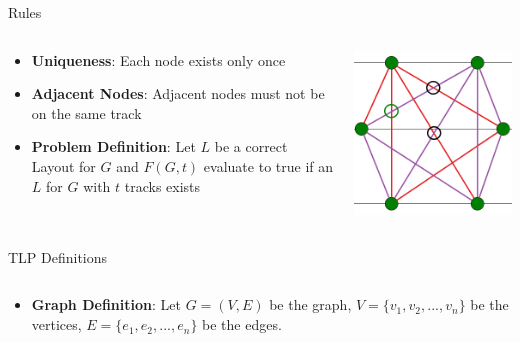 \documentclass[hyperref={pdfpagelabels=false},aspectratio=169]{beamer}
\theoremstyle{definition}
\begin{document}
\begin{frame}{Rules}
\begin{columns}
    \begin{column}{0.5\textwidth}
        \begin{itemize}
            \item \textbf{Uniqueness}: Each node exists only once
            \item \textbf{Adjacent Nodes}: Adjacent nodes must not be on the same track
            \item \textbf{Problem Definition}: Let $L$ be a correct Layout for $G$ and $F(G, t)$ evaluate to true if an $L$ for $G$ with $t$ tracks exists
        \end{itemize}
    \end{column}
    \begin{column}{0.5\textwidth}
        \vspace{2cm}
        \includegraphics[scale=0.6]{img/Regeln_3.png}
    \end{column}
\end{columns}
\end{frame}

\begin{frame}{TLP Definitions}
    \begin{columns}
        \begin{column}{1\textwidth}
            \begin{itemize}
            \item \textbf{Graph Definition}: Let $G = (V,E)$ be the graph, $V =\{v_1,v_2,...,v_n\}$ be the vertices, $E = \{e_1,e_2,...,e_n\}$ be the edges.
            \end{itemize}
        \end{column}
    \end{columns}
\end{frame}
\end{document}
